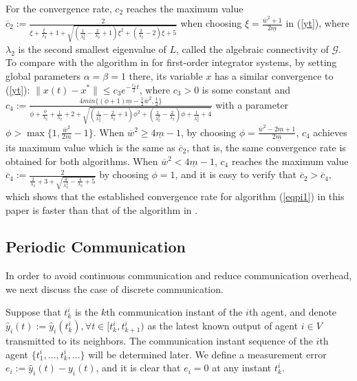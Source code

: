 \documentclass[final,5p,times,twocolumn,authoryear]{elsarticle}
\begin{document}
\begin{remark}
	For the convergence rate, $c_2$ reaches the maximum value
	$\overline c_2:=\frac{2}{\xi+\frac{\xi}{\lambda_2} +1 + \sqrt{(\frac{1}{\lambda_2^2}-\frac{2}{\lambda_2}+1)\xi^2+(\frac{2}{\lambda_2}-2)\xi+5}}$ when choosing $\xi=\frac{\overline w^2 + 1}{2\underline m}$ in (\ref{yt}), where $\lambda_2$ is the second smallest eigenvalue of $L$, called the algebraic connectivity of $\mathcal{G}$.
	To compare with the algorithm in \citet{kia2015} for first-order integrator systems, by setting global parameters $\alpha=\beta=1$ there, its variable $x$ has a similar convergence to (\ref{yt}):  $\|x(t)-x^*\| \le c_3e^{-\frac{c_4}{2}t}$, where $c_3>0$ is some constant and $c_4:=\frac{4min\{(\phi+1)\underline m-\frac{1}{2}\overline w^2,\frac{1}{2}\}}{\phi+\frac{\phi}{\lambda_2} + \frac{1}{\lambda_2} +2 + \sqrt{(\frac{1}{\lambda_2^2}-\frac{2}{\lambda_2}+1)\phi^2+(\frac{2}{\lambda_2^2}-\frac{2}{\lambda_2})\phi+\frac{1}{\lambda_2^2}+4}}$
	with a parameter $\phi>\max\{1,\frac{\overline w^2}{2\underline m}-1\}$. 
	When $\overline w^2\ge4\underline m-1$, by choosing $\phi=\frac{\overline w^2 - 2\underline m + 1}{2\underline m}$, $c_4$ achieves its maximum value which is the same as $\overline c_2$, that is, the same convergence rate is obtained for both algorithms.
	When $\overline w^2<4\underline m-1$, $c_4$ reaches the maximum value $\overline c_4:=\frac{2}
	{\frac{2}{\lambda_2}+3+\sqrt{\frac{4}{\lambda_2^2}-\frac{4}{\lambda_2}+5}}$ 
	by choosing $\phi=1$, and it is easy to verify that $\overline c_2>\overline c_4$, which shows that the established convergence rate for algorithm (\ref{eqpi1}) in this paper is faster than that of the algorithm in \citet{kia2015}. 
\end{remark}

\subsection{Periodic Communication}
In order to avoid continuous communication and reduce communication overhead, we next discuss the case of discrete communication.

Suppose that $t_k^i$ is the $k$th communication instant of the $i$th agent, and denote $\hat{y}_i(t):=\hat y_i(t_k^i), \forall t\in [t_k^i,t_{k+1}^i)$ as the latest known output of agent $i\in V$ transmitted to its neighbors. The communication instant sequence of the $i$th agent $\{t_1^i, \dots, t_k^i, \dots\}$ will be determined later. We define a measurement error $e_i:=\hat y_i(t)-y_i(t)$, and it is clear that $e_i=0$ at any instant $t_k^i$.
\end{document}
